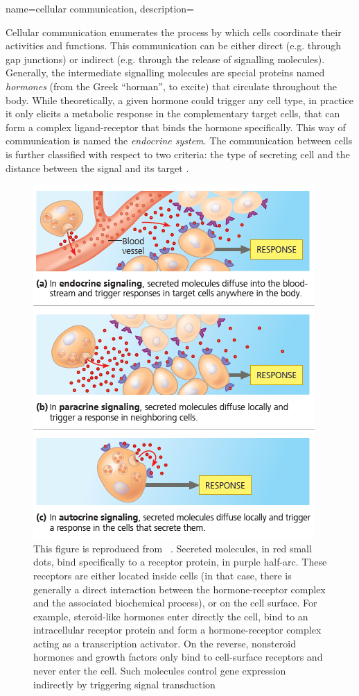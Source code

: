 {name=cellular communication, 
description={Cellular communication enumerates the process by which cells coordinate their activities and functions. This communication can be either direct (e.g. through gap junctions) or indirect (e.g. through the release of signalling molecules). Generally, the intermediate signalling molecules are special proteins named \textit{hormones} (from the Greek \enquote{horman}, to excite) that circulate throughout the body. While theoretically, a given hormone could trigger any cell type, in practice it only elicits a metabolic response in the complementary target cells, that can form a complex ligand-receptor that binds the hormone specifically. This way of communication is named the \textit{endocrine system}.
The communication between cells is further classified with respect to two criteria: the type of secreting cell and the distance between the signal and its target . 
\begin{figure}
    \centering
    \includegraphics{figures/cell-signalling.png}
    \caption[Categories of intercellular communication.]{This figure is reproduced from ~\autocite[Fig.~45.2, p.~1000]{campbell_etal20}. Secreted molecules, in red small dots, bind specifically to a receptor protein, in purple half-arc. These receptors are either located inside cells (in that case, there is generally a direct interaction between the hormone-receptor complex and the associated biochemical process), or on the cell surface. For example, steroid-like hormones enter directly the cell, bind to an intracellular receptor protein and form a hormone-receptor complex acting as a transcription activator. On the reverse, nonsteroid hormones and growth factors only bind to cell-surface receptors and never enter the cell. Such molecules control gene expression indirectly by triggering signal \gls{transduction}}
    \label{fig:cellular-communication}
\end{figure}
}}

